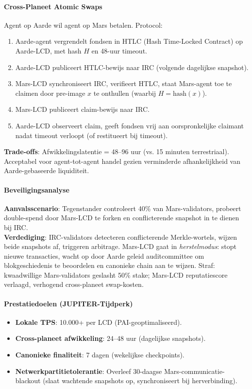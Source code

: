 \documentclass[11pt]{article}
\begin{document}
\paragraph{Cross-Planeet Atomic Swaps}
Agent op Aarde wil agent op Mars betalen. Protocol:
\begin{enumerate}[noitemsep]
  \item Aarde-agent vergrendelt fondsen in HTLC (Hash Time-Locked Contract) op Aarde-LCD, met hash $H$ en 48-uur timeout.
  \item Aarde-LCD publiceert HTLC-bewijs naar IRC (volgende dagelijkse snapshot).
  \item Mars-LCD synchroniseert IRC, verifieert HTLC, staat Mars-agent toe te claimen door pre-image $x$ te onthullen (waarbij $H = \text{hash}(x)$).
  \item Mars-LCD publiceert claim-bewijs naar IRC.
  \item Aarde-LCD observeert claim, geeft fondsen vrij aan oorspronkelijke claimant nadat timeout verloopt (of restitueert bij timeout).
\end{enumerate}
\textbf{Trade-offs}: Afwikkelingslatentie = 48--96 uur (vs. 15 minuten terrestriaal). Acceptabel voor agent-tot-agent handel gezien verminderde afhankelijkheid van Aarde-gebaseerde liquiditeit.

\paragraph{Beveiligingsanalyse}
\textbf{Aanvalsscenario}: Tegenstander controleert 40\% van Mars-validators, probeert double-spend door Mars-LCD te forken en conflicterende snapshot in te dienen bij IRC.\\
\textbf{Verdediging}: IRC-validators detecteren conflicterende Merkle-wortels, wijzen beide snapshots af, triggeren arbitrage. Mars-LCD gaat in \emph{herstelmodus}: stopt nieuwe transacties, wacht op door Aarde geleid auditcommittee om blokgeschiedenis te beoordelen en canonieke chain aan te wijzen. Straf: kwaadwillige Mars-validators geslasht 50\% stake; Mars-LCD reputatiescore verlaagd, verhogend cross-planeet swap-kosten.

\paragraph{Prestatiedoelen (JUPITER-Tijdperk)}
\begin{itemize}[noitemsep]
  \item \textbf{Lokale TPS}: 10.000+ per LCD (PAI-geoptimaliseerd).
  \item \textbf{Cross-planeet afwikkeling}: 24--48 uur (dagelijkse snapshots).
  \item \textbf{Canonieke finaliteit}: 7 dagen (wekelijkse checkpoints).
  \item \textbf{Netwerkpartitietolerantie}: Overleef 30-daagse Mars-communicatie-blackout (slaat wachtende snapshots op, synchroniseert bij herverbinding).
\end{itemize}
\end{document}
